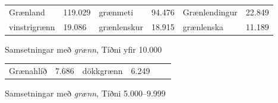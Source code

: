 \documentclass[../samsetningasafn.tex]{subfiles}
\begin{document}
\begin{wordlist}[H]
\begin{tcolorbox}

	\setlength{\extrarowheight}{3pt} 
	\begin{tabular}{BlBlBl}
		Grænland		& 119.029		& 		
		grænmeti		& 94.476		& 		
		Grænlendingur	& 22.849		\\ 	
		vinstrigrænn		& 19.086		& 		
		grænlenskur		& 18.915		&   	
		grænlenska		& 11.189		 		
	\end{tabular}

\end{tcolorbox}
	\caption{Samsetningar með \textit{grænn}, Tíðni yfir 10.000}
	\label{listi:graent.10000}
\end{wordlist}	
		
\begin{wordlist}[H]
\begin{tcolorbox}

	\setlength{\extrarowheight}{3pt}
	\begin{tabular}{BlBlBl}		
		Grænahlíð		& 7.686		& 	
		dökkgrænn		& 6.249		& 	
						& 
\end{tabular}

\end{tcolorbox}
	\caption{Samsetningar með \textit{grænn}, Tíðni 5.000--9.999}
	\label{listi:graent.5000}
\end{wordlist}	
\end{document}
